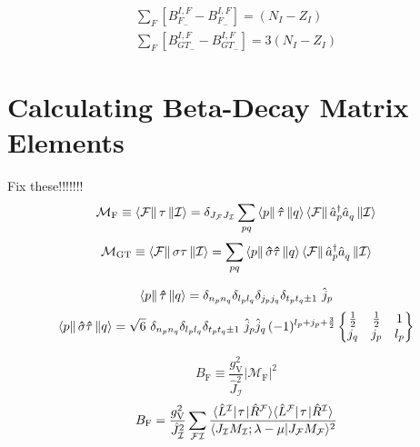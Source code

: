 \documentclass[thesis.tex]{subfiles}
\begin{document}
\begin{gather}
  \sum_{F} \left[ B_{F_{-}}^{I,F} - B_{F_{-}}^{I,F} \right] = \left( N_{I} - Z_{I} \right) \\
  \sum_{F} \left[ B_{GT_{-}}^{I,F} - B_{GT_{-}}^{I,F} \right] = 3\left( N_{I} - Z_{I} \right)
\end{gather}


\section{Calculating Beta-Decay Matrix Elements}

Fix these!!!!!!!
\begin{equation}
  \mathcal{M}_{\text{F}} \equiv \left\langle \mathcal{F} \right\|\mathbf{\tau}\left\| \mathcal{I} \right\rangle = \delta_{J_\mathcal{F}J_{\mathcal{I}}}\sum_{pq}\left\langle p \right\|\mathbf{\hat{\tau}}\left\| q \right\rangle\left\langle \mathcal{F} \right\|\hat{a}_{p}^{\dagger}\hat{a}_{q}^{}\left\| \mathcal{I} \right\rangle
\end{equation}
\begin{equation}
  \mathcal{M}_{\text{GT}} \equiv \left\langle \mathcal{F} \right\|\mathbf{\sigma\tau}\left\| \mathcal{I} \right\rangle = \sum_{pq}\left\langle p \right\|\mathbf{\hat{\sigma}\hat{\tau}}\left\| q \right\rangle\left\langle \mathcal{F} \right\|\hat{a}_{p}^{\dagger}\hat{a}_{q}^{}\left\| \mathcal{I} \right\rangle
\end{equation}

\begin{equation}
  \left\langle p \right\|\mathbf{\hat{\tau}}\left\| q \right\rangle = \delta_{n_{p}n_{q}}\delta_{l_{p}l_{q}}\delta_{j_{p}j_{q}}\delta_{t_{p}t_{q}\pm 1}\ \hat{j}_{p}
\end{equation}
\begin{equation}
  \relement{p}{\mathbf{\hat{\sigma}\hat{\tau}}}{q} = \sqrt{6}\ \delta_{n_{p}n_{q}}\delta_{l_{p}l_{q}}\delta_{t_{p}t_{q}\pm 1}\ \hat{j}_{p}\hat{j}_{q}\mathop{(-1)^{l_{p}+j_{p}+\frac{3}{2}}}\sixj{\frac{1}{2}}{\frac{1}{2}}{1}{j_{q}}{j_{p}}{l_{p}}
\end{equation}


\begin{equation}
  B_{\text{F}} \equiv \frac{g^{2}_{\text{V}}}{\hat{J}^{2}_{\mathcal{I}}}\lvert\mathcal{M}_{\text{F}}\rvert^{2}
\end{equation}
\begin{equation}
  B_{\text{F}} = \frac{g^{2}_{\text{V}}}{\hat{J}^{2}_{\mathcal{I}}}\sum_{\mathcal{F}\mathcal{I}}\frac{\langle \hat{L}\hspace{-0.1pt}^{\mathcal{I}} |\hspace{1pt}\mathbf{\tau}\hspace{1pt}\lvert \hat{R}\hspace{-0.1pt}^{\mathcal{F}} \rangle\langle \hat{L}\hspace{-0.1pt}^{\mathcal{F}} |\hspace{1pt}\mathbf{\tau}\hspace{1pt}\lvert \hat{R}\hspace{-0.1pt}^{\mathcal{I}} \rangle}{\langle J_{\mathcal{I}}M_{\mathcal{I}};\lambda-\mu | J_{\mathcal{F}}M_{\mathcal{F}}\rangle^{2}}
\end{equation}
\end{document}
